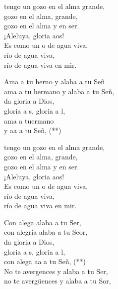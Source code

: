 \documentclass[12pt]{article}
\begin{document}
\begin{multicols*}{2}
\begin{cancion}%
	\begin{chorus}%
	 tengo un gozo en el alma grande,\\
gozo en el alma, grande,\\
	gozo en el alma y en ser.\\
	¡Aleluya, gloria aos!\\
	Es como un o de agua viva, \\
río de agua viva,\\
	río de agua viva en mir. \\
	\end{chorus}%
	Ama a tu herno y alaba a tu Señ \\
	ama a tu hermano y alaba a tu Señ, \\
da gloria a Dios,\\
	gloria a s, gloria a l,\\
	ama a tuermano \\
	y aa a tu Señ, (**)\\
	\begin{chorus}%
	 tengo un gozo en el alma grande,\\
gozo en el alma, grande,\\
	gozo en el alma y en ser.\\
	¡Aleluya, gloria aos!\\
	Es como un o de agua viva, \\
río de agua viva,\\
	río de agua viva en mir. \\
	\end{chorus}%
	Con alega alaba a tu Ser, \\
	con alegría alaba a tu Seor,\\
da gloria a Dios,\\
	gloria a s, gloria a l,\\
	con alega aa a tu Señ, (**)  \\
	No te avergences y alaba a tu Ser,\\
	no te avergüences y alaba a tu Sor, \\

\end{cancion}
\end{multicols*}
\end{document}
